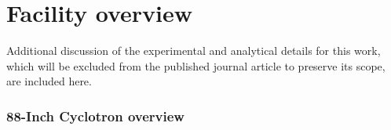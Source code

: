 % 
% 
% 
% 
% 





% 
% 
% 


% 
% 



% 
% 
% 





\section{Facility overview}


Additional discussion of the experimental and analytical details for this work, which will be excluded from the published journal article to preserve its scope, are included here.

\subsubsection{88-Inch Cyclotron overview}


